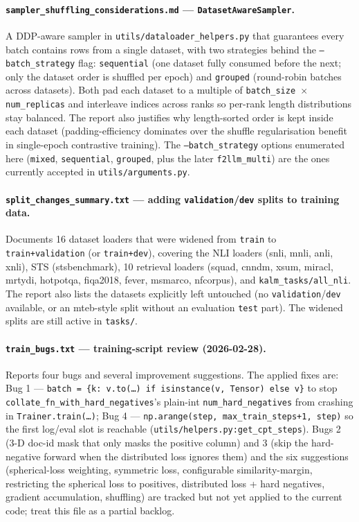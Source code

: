 \documentclass{article}
\begin{document}
\paragraph{\texttt{sampler\_shuffling\_considerations.md} ---
\texttt{DatasetAwareSampler}.} A DDP-aware sampler in
\texttt{utils/dataloader\_helpers.py} that guarantees every batch
contains rows from a single dataset, with two strategies behind the
\texttt{--batch\_strategy} flag: \texttt{sequential} (one dataset
fully consumed before the next; only the dataset order is shuffled
per epoch) and \texttt{grouped} (round-robin batches across
datasets). Both pad each dataset to a multiple of
\texttt{batch\_size $\times$ num\_replicas} and interleave indices
across ranks so per-rank length distributions stay balanced. The
report also justifies why length-sorted order is kept inside each
dataset (padding-efficiency dominates over the shuffle regularisation
benefit in single-epoch contrastive training). The
\texttt{--batch\_strategy} options enumerated here
(\texttt{mixed}, \texttt{sequential}, \texttt{grouped}, plus the
later \texttt{f2llm\_multi}) are the ones currently accepted in
\texttt{utils/arguments.py}.

\paragraph{\texttt{split\_changes\_summary.txt} --- adding
\texttt{validation}/\texttt{dev} splits to training data.} Documents
16 dataset loaders that were widened from \texttt{train} to
\texttt{train+validation} (or \texttt{train+dev}), covering the NLI
loaders (snli, mnli, anli, xnli), STS (stsbenchmark), 10 retrieval
loaders (squad, cnndm, xsum, miracl, mrtydi, hotpotqa, fiqa2018,
fever, msmarco, nfcorpus), and \texttt{kalm\_tasks/all\_nli}. The
report also lists the datasets explicitly left untouched (no
\texttt{validation}/\texttt{dev} available, or an mteb-style split
without an evaluation \texttt{test} part). The widened splits are
still active in \texttt{tasks/}.

\paragraph{\texttt{train\_bugs.txt} --- training-script review
(2026-02-28).} Reports four bugs and several improvement
suggestions. The applied fixes are: Bug 1 ---
\texttt{batch = \{k: v.to(\dots) if isinstance(v, Tensor) else v\}}
to stop \texttt{collate\_fn\_with\_hard\_negatives}'s plain-int
\texttt{num\_hard\_negatives} from crashing in
\texttt{Trainer.train(\dots)}; Bug 4 ---
\texttt{np.arange(step, max\_train\_steps+1, step)} so the first
log/eval slot is reachable (\texttt{utils/helpers.py:get\_cpt\_steps}).
Bugs 2 (3-D doc-id mask that only masks the positive column) and
3 (skip the hard-negative forward when the distributed loss ignores
them) and the six suggestions (spherical-loss weighting, symmetric
loss, configurable similarity-margin, restricting the spherical
loss to positives, distributed loss + hard negatives, gradient
accumulation, shuffling) are tracked but not yet applied to the
current code; treat this file as a partial backlog.
\end{document}
